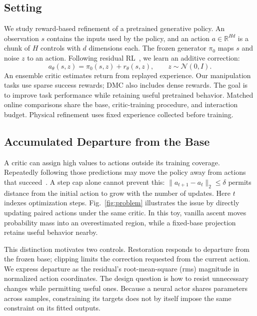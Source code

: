 \subsection{Setting}

We study reward-based refinement of a pretrained generative policy.
An observation $s$ contains the inputs used by the policy, and an action
$a\in\mathbb{R}^{Hd}$ is a chunk of $H$ controls with $d$ dimensions each.
The frozen generator $\pi_0$ maps $s$ and noise $z$ to an action. Following
residual RL~\cite{dicerl2026}, we learn an additive correction:
\begin{equation}
  a_\theta(s,z)=\pi_0(s,z)+r_\theta(s,z),
  \qquad z\sim\mathcal{N}(0,I).
  \label{eq:residual}
\end{equation}
An ensemble critic estimates return from replayed experience. Our
manipulation tasks use sparse success rewards; DMC also includes dense
rewards. The goal is to improve task performance while retaining useful
pretrained behavior. Matched online comparisons share the base,
critic-training procedure, and interaction budget. Physical refinement
uses fixed experience collected before training.

\subsection{Accumulated Departure from the Base}

A critic can assign high values to actions outside its training coverage.
Repeatedly following those predictions may move the policy away from actions
that succeed~\cite{fujimoto2019bcq}. A step cap alone cannot prevent this:
$\|a_{t+1}-a_t\|_2\leq\delta$ permits distance from the initial action to
grow with the number of updates. Here $t$ indexes optimization steps.
Fig.~\ref{fig:problem} illustrates the issue by directly updating paired
actions under the same critic. In this toy, vanilla ascent moves probability
mass into an overestimated region, while a fixed-base projection retains
useful behavior nearby.

This distinction motivates two controls. Restoration responds to departure
from the frozen base; clipping limits the correction requested from the
current action. We express departure as the residual's root-mean-square
(rms) magnitude in normalized action coordinates. The design question is
how to resist unnecessary changes while permitting useful ones. Because
a neural actor shares parameters across samples, constraining its targets
does not by itself impose the same constraint on its fitted outputs.
